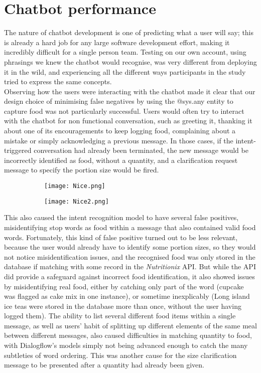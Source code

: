 \section{Chatbot performance}
The nature of chatbot development is one of predicting what a user will say; this is already a hard job for any large software development effort, making it incredibly difficult for a single person team.
Testing on our own account, using phrasings we knew the chatbot would recognise, was very different from deploying it in the wild, and experiencing all the different ways participants in the study tried to express the same concepts. \\
Observing how the users were interacting with the chatbot made it clear that our design choice of minimising false negatives by using the @sys.any entity to capture food was not particularly successful. Users would often try to interact with the chatbot for non functional conversation, such as greeting it, thanking it about one of its encouragements to keep logging food, complaining about a mistake or simply acknowledging a previous message. In those cases, if the intent-triggered conversation had already been terminated, the new message would be incorrectly identified as food, without a quantity, and a clarification request message to specify the portion size would be fired. \\
\begin{figure}[h!]
  \centering
  \begin{subfigure}[b]{\linewidth}
    \texttt{[image: Nice.png]}
  \end{subfigure}
  \begin{subfigure}[b]{\linewidth}
    \texttt{[image: Nice2.png]}
  \end{subfigure}
\end{figure}
This also caused the intent recognition model to have several false positives, misidentifying stop words as food within a message that also contained valid food words. Fortunately, this kind of false positive turned out to be less relevant, because the user would already have to identify some portion sizes, so they would not notice misidentification issues, and the recognised food was only stored in the database if matching with some record in the \textit{Nutritionix} API. But while the API did provide a safeguard against incorrect food identification, it also showed issues by misidentifying real food, either by catching only part of the word (cupcake was flagged as cake mix in one instance), or sometime inexplicably (Long island ice teas were stored in the database more than once, without the user having logged them). The ability to list several different food items within a single message, as well as users' habit of splitting up different elements of the same meal between different messages, also caused difficulties in matching quantity to food, with Dialogflow's models simply not being advanced enough to catch the many subtleties of word ordering. This was another cause for the size clarification message to be presented after a quantity had already been given.\\
